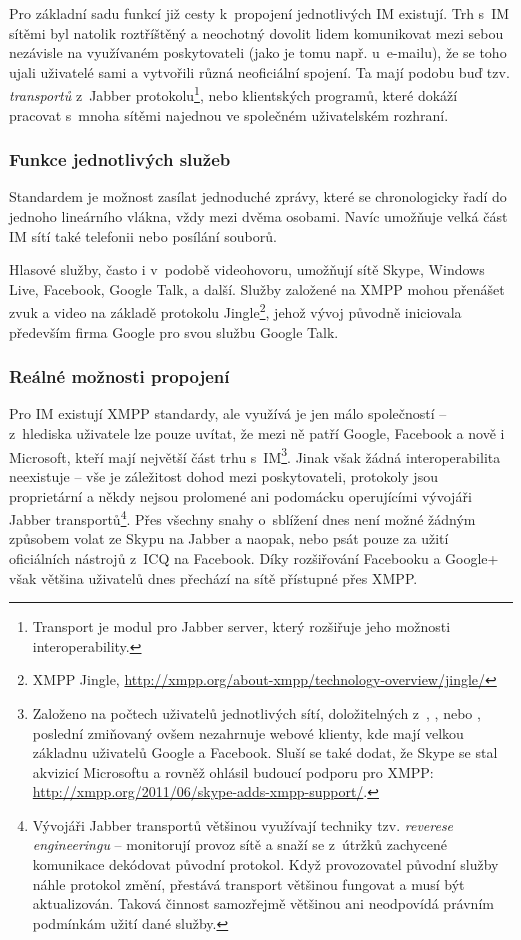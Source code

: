 \documentclass[12pt,oneside,final]{fithesis2}
\begin{document}
Pro základní sadu funkcí již cesty k~propojení jednotlivých IM existují. Trh s~IM sítěmi byl natolik roztříštěný a neochotný dovolit lidem komunikovat mezi sebou nezávisle na využívaném poskytovateli (jako je tomu např. u~e-mailu), že se toho ujali uživatelé sami a vytvořili různá neoficiální spojení. Ta mají podobu buď tzv. \emph{transportů} z~Jabber protokolu\footnote{Transport je modul pro Jabber server, který rozšiřuje jeho možnosti interoperability.}, nebo klientských programů, které dokáží pracovat s~mnoha sítěmi najednou ve společném uživatelském rozhraní.

\subsubsection*{Funkce jednotlivých služeb}
Standardem je možnost zasílat jednoduché zprávy, které se chronologicky řadí do jednoho lineárního vlákna, vždy mezi dvěma osobami. Navíc umožňuje velká část IM sítí také telefonii nebo posílání souborů.

Hlasové služby, často i v~podobě videohovoru, umožňují sítě Skype, Windows Live, Facebook, Google Talk, a další. Služby založené na XMPP mohou přenášet zvuk a video na základě protokolu Jingle\footnote{XMPP Jingle, \url{http://xmpp.org/about-xmpp/technology-overview/jingle/}}, jehož vývoj původně iniciovala především firma Google pro svou službu Google Talk.

\subsubsection*{Reálné možnosti propojení}
Pro IM existují XMPP standardy, ale využívá je jen málo společností -- z~hlediska uživatele lze pouze uvítat, že mezi ně patří Google, Facebook a nově i Microsoft, kteří mají největší část trhu s~IM\footnote{Založeno na počtech uživatelů jednotlivých sítí, doložitelných z~\cite{obasanjo2010anyone}, \cite{zuckerberg2010million}, nebo \cite{opswat2010security}, poslední zmiňovaný ovšem nezahrnuje webové klienty, kde mají velkou základnu uživatelů Google a Facebook. Sluší se také dodat, že Skype se stal akvizicí Microsoftu a rovněž ohlásil budoucí podporu pro XMPP: \url{http://xmpp.org/2011/06/skype-adds-xmpp-support/}.}. Jinak však žádná interoperabilita neexistuje -- vše je záležitost dohod mezi poskytovateli, protokoly jsou proprietární a někdy nejsou prolomené ani podomácku operujícími vývojáři Jabber transportů\footnote{Vývojáři Jabber transportů většinou využívají techniky tzv. \emph{reverese engineeringu} -- monitorují provoz sítě a snaží se z~útržků zachycené komunikace dekódovat původní protokol. Když provozovatel původní služby náhle protokol změní, přestává transport většinou fungovat a musí být aktualizován. Taková činnost samozřejmě většinou ani neodpovídá právním podmínkám užití dané služby.}. Přes všechny snahy o~sblížení dnes není možné žádným způsobem volat ze Skypu na Jabber a naopak, nebo psát pouze za užití oficiálních nástrojů z~ICQ na Facebook. Díky rozšiřování Facebooku a Google+ však většina uživatelů dnes přechází na sítě přístupné přes XMPP.
\end{document}
